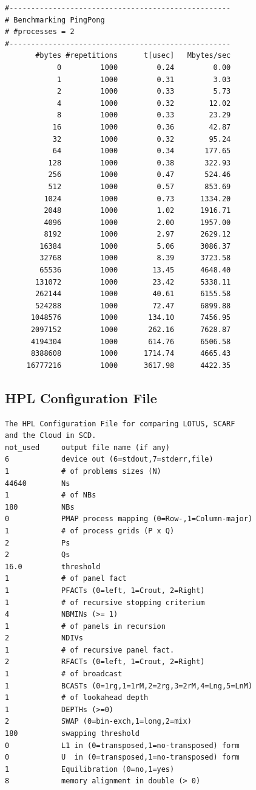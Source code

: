 \documentclass{article}
\begin{document}
        \begin{verbatim}
#---------------------------------------------------
# Benchmarking PingPong
# #processes = 2
#---------------------------------------------------
       #bytes #repetitions      t[usec]   Mbytes/sec
            0         1000         0.24         0.00
            1         1000         0.31         3.03
            2         1000         0.33         5.73
            4         1000         0.32        12.02
            8         1000         0.33        23.29
           16         1000         0.36        42.87
           32         1000         0.32        95.24
           64         1000         0.34       177.65
          128         1000         0.38       322.93
          256         1000         0.47       524.46
          512         1000         0.57       853.69
         1024         1000         0.73      1334.20
         2048         1000         1.02      1916.71
         4096         1000         2.00      1957.00
         8192         1000         2.97      2629.12
        16384         1000         5.06      3086.37
        32768         1000         8.39      3723.58
        65536         1000        13.45      4648.40
       131072         1000        23.42      5338.11
       262144         1000        40.61      6155.58
       524288         1000        72.47      6899.88
      1048576         1000       134.10      7456.95
      2097152         1000       262.16      7628.87
      4194304         1000       614.76      6506.58
      8388608         1000      1714.74      4665.43
     16777216         1000      3617.98      4422.35
        \end{verbatim}

    \subsection{HPL Configuration File}
        \label{appendix:hpl-conf}

        \begin{verbatim}
The HPL Configuration File for comparing LOTUS, SCARF
and the Cloud in SCD.
not_used     output file name (if any)
6            device out (6=stdout,7=stderr,file)
1            # of problems sizes (N)
44640        Ns
1            # of NBs
180          NBs
0            PMAP process mapping (0=Row-,1=Column-major)
1            # of process grids (P x Q)
2            Ps
2            Qs
16.0         threshold
1            # of panel fact
1            PFACTs (0=left, 1=Crout, 2=Right)
1            # of recursive stopping criterium
4            NBMINs (>= 1)
1            # of panels in recursion
2            NDIVs
1            # of recursive panel fact.
2            RFACTs (0=left, 1=Crout, 2=Right)
1            # of broadcast
1            BCASTs (0=1rg,1=1rM,2=2rg,3=2rM,4=Lng,5=LnM)
1            # of lookahead depth
1            DEPTHs (>=0)
2            SWAP (0=bin-exch,1=long,2=mix)
180          swapping threshold
0            L1 in (0=transposed,1=no-transposed) form
0            U  in (0=transposed,1=no-transposed) form
1            Equilibration (0=no,1=yes)
8            memory alignment in double (> 0)

        \end{verbatim}
\end{document}
